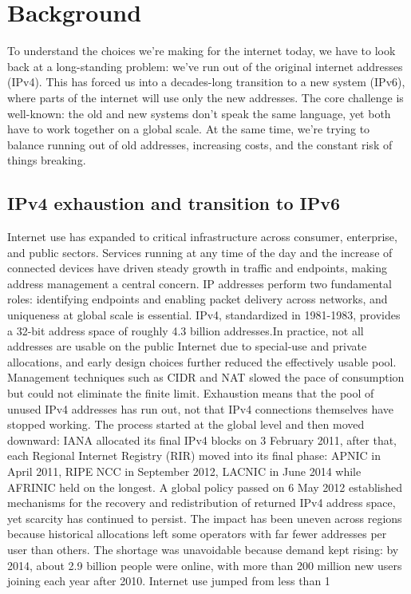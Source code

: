 \chapter{Background}
To understand the choices we're making for the internet today, we have to look back at a long-standing problem: we've run out of the original internet addresses (IPv4). This has forced us into a decades-long transition to a new system (IPv6), where parts of the internet will use only the new addresses. The core challenge is well-known: the old and new systems don't speak the same language, yet both have to work together on a global scale. At the same time, we’re trying to balance running out of old addresses, increasing costs, and the constant risk of things breaking\cite{7737362,LEVIN20141059}.

\section{IPv4 exhaustion and transition to IPv6}
Internet use has expanded to critical infrastructure across consumer, enterprise, and public sectors. Services running at any time of the day and the increase of connected devices have driven steady growth in traffic and endpoints, making address management a central concern\cite{7737362,LEVIN20141059}. IP addresses perform two fundamental roles: identifying endpoints and enabling packet delivery across networks, and uniqueness at global scale is essential\cite{LEVIN20141059}.
IPv4, standardized in 1981-1983, provides a 32-bit address space of roughly 4.3 billion addresses\cite{rfc791}.In practice, not all addresses are usable on the public Internet due to special-use and private allocations, and early design choices further reduced the effectively usable pool\cite{rfc1918,7737362,LEVIN20141059}. Management techniques such as CIDR and NAT slowed the pace of consumption but could not eliminate the finite limit\cite{7737362}.
Exhaustion means that the pool of unused IPv4 addresses has run out, not that IPv4 connections themselves have stopped working. The process started at the global level and then moved downward: IANA allocated its final IPv4 blocks on 3 February 2011, after that, each Regional Internet Registry (RIR) moved into its final phase: APNIC in April 2011, RIPE NCC in September 2012, LACNIC in June 2014 while AFRINIC held on the longest\cite{LEVIN20141059}. A global policy passed on 6 May 2012 established mechanisms for the recovery and redistribution of returned IPv4 address space, yet scarcity has continued to persist\cite{7737362}. The impact has been uneven across regions because historical allocations left some operators with far fewer addresses per user than others\cite{LEVIN20141059}.
The shortage was unavoidable because demand kept rising: by 2014, about 2.9 billion people were online, with more than 200 million new users joining each year after 2010. Internet use jumped from less than 1%

